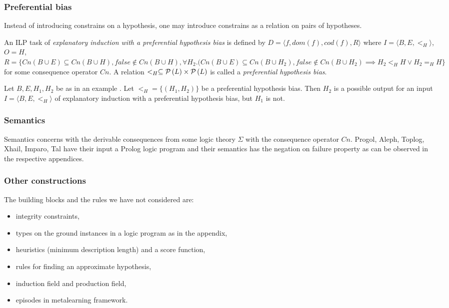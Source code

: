 \subsubsection{Preferential bias}
Instead of introducing constrains on a hypothesis, one may introduce constrains as a relation on pairs of hypotheses.

\begin{defn}
An ILP task of \emph{explanatory induction with a preferential hypothesis bias} is defined by $D=\langle f, dom(f), cod(f), R \rangle$ where $I=\langle B, E, <_H\rangle$, $O=H$,
$R=\{Cn(B \cup E) \subseteq Cn(B \cup H), false \not\in Cn(B \cup H), \forall H_2. (Cn(B \cup E) \subseteq Cn(B \cup H_2), false \not\in Cn(B \cup H_2) \implies H_2 <_H H \lor H_2 =_H H \}$ for some consequence operator $Cn$. A relation $<_H \subseteq \mathcal{P} \left({ L }\right) \times \mathcal{P} \left({ L }\right)$ is called a \emph{preferential hypothesis bias}.
\end{defn}

\begin{exmp}
Let $B, E, H_1, H_2$ be as in an example .
Let $<_H=\{(H_1, H_2)\}$ be a preferential hypothesis bias.
Then $H_2$ is a possible output for an input $I=\langle B, E, <_H \rangle$ of explanatory induction with a preferential hypothesis bias, but $H_1$ is not.
\end{exmp}

\subsubsection{Semantics}
Semantics concerns with the derivable consequences from some logic theory $\Sigma$ with the consequence operator $Cn$. Progol, Aleph, Toplog, Xhail, Imparo, Tal have their input a Prolog logic program and their semantics has the negation on failure property as can be observed in the respective appendices.

\subsubsection{Other constructions}
The building blocks and the rules we have not considered are:
\begin{itemize}
\item integrity constraints,
\item types on the ground instances in a logic program as in the appendix,
\item heuristics (minimum description length) and a score function,
\item rules for finding an approximate hypothesis,
\item induction field\cite{yamamoto2012inverse} and production field\cite{inoue2004induction},
\item episodes in metalearning framework\cite{muggleton2013meta}.
\end{itemize}

